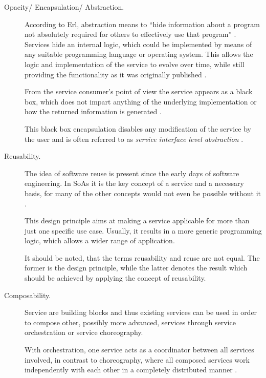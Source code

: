 \begin{description}
\item [Opacity/ Encapsulation/ Abstraction.]
According to Erl, abstraction means to ``hide information about a program not absolutely required for others to effectively use that program'' \cite[ch.8.1.]{erl2008}.
Services hide an internal logic, which could be implemented by means of any suitable programming language or operating system. This allows the logic and implementation of the service to evolve over time, while still providing the functionality as it was originally published \cite[ch.8.1]{erl2008}.

From the service consumer's point of view the service appears as a black box, which does not impart anything of the underlying implementation or how the returned information is generated \cite{opengroup} \cite{breivold} \cite{arrowhead} \cite[p.27]{erl2011}.

This black box encapsulation disables any modification of the service by the user and is often referred to as \emph{service interface level abstraction} \cite{breivold}.

\item [Reusability.]
The idea of software reuse is present since the early days of software engineering. In SoAs it is the key concept of a service and a necessary basis, for many of the other concepts would not even be possible without it \cite[ch.9.1.]{erl2008} \cite[p.27]{erl2011}.

This design principle aims at making a service applicable for more than just one specific use case. Usually, it results in a more generic programming logic, which allows a wider range of application.

It should be noted, that the terms reusability and reuse are not equal. The former is the design principle, while the latter denotes the result which should be achieved by applying the concept of reusability.

\item [Composability.] 
Service are building blocks and thus existing services can be used in order to compose other, possibly more advanced, services through service orchestration or service choreography. 

With orchestration, one service acts as a coordinator between all services involved, in contrast to choreography, where all composed services work independently with each other in a completely distributed manner \cite{opengroup} \cite{arrowhead} \cite{breivold} \cite[p.27]{erl2011}.


\end{description}
